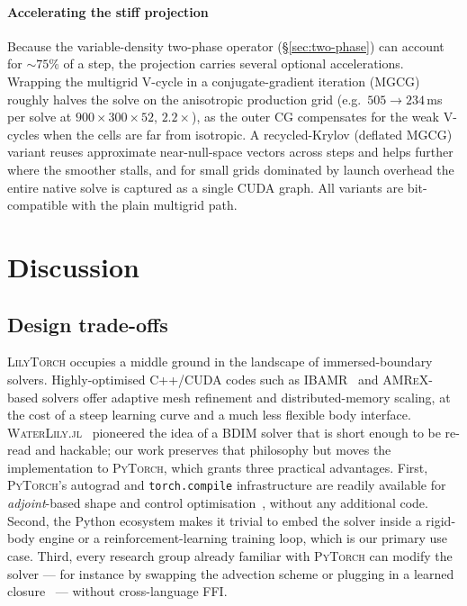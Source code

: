 \documentclass[journal,twoside,10pt]{IEEEtran}
\newcommand{\lilytorch}{\textsc{LilyTorch}\xspace}
\newcommand{\pytorch}{\textsc{PyTorch}\xspace}
\newcommand{\waterlily}{\textsc{WaterLily.jl}\xspace}
\begin{document}
\paragraph{Accelerating the stiff projection}
Because the variable-density two-phase operator
(§\ref{sec:two-phase}) can account for $\sim\!75\%$ of a step, the
projection carries several optional accelerations.  Wrapping the
multigrid V-cycle in a conjugate-gradient iteration (MGCG) roughly
halves the solve on the anisotropic production grid (e.g.\
$505\!\to\!234$\,ms per solve at $900{\times}300{\times}52$,
$2.2\times$), as the outer CG compensates for the weak V-cycles when
the cells are far from isotropic.  A recycled-Krylov (deflated MGCG)
variant reuses approximate near-null-space vectors across steps and
helps further where the smoother stalls, and for small grids dominated
by launch overhead the entire native solve is captured as a single
CUDA graph.  All variants are bit-compatible with the plain multigrid
path.


\section{Discussion}\label{sec:discussion}

\subsection{Design trade-offs}

\lilytorch occupies a middle ground in the landscape of
immersed-boundary solvers.  Highly-optimised C++/CUDA codes such as
\textsc{IBAMR}~\cite{bhalla2013unified} and
\textsc{AMReX}-based solvers offer adaptive mesh refinement and
distributed-memory scaling, at the cost of a steep learning curve
and a much less flexible body
interface.  \waterlily~\cite{weymouth2024waterlily} pioneered the
idea of a BDIM solver that is short enough to be re-read and
hackable; our work preserves that philosophy but moves the
implementation to \pytorch, which grants three practical
advantages.  First, \pytorch's autograd and \texttt{torch.compile}
infrastructure are readily available for \emph{adjoint}-based shape
and control optimisation~\cite{kochkov2021machinelearned}, without
any additional code.  Second, the Python ecosystem makes it trivial
to embed the solver inside a rigid-body engine or a
reinforcement-learning training loop, which is our primary use case.  Third, every
research group already familiar with \pytorch can modify the solver
--- for instance by swapping the advection scheme or plugging in a
learned closure~\cite{brunton2020machine} --- without cross-language
FFI.
\end{document}
